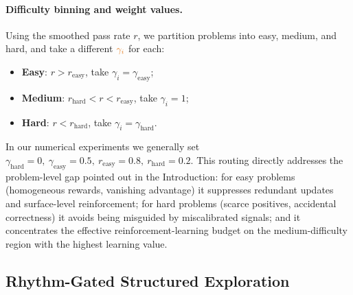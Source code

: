 \documentclass{article}
\begin{document}
\paragraph{Difficulty binning and weight values.}
Using the smoothed pass rate $r$, we partition problems into easy, medium, and hard, and take a different ${\color{cGamma}\gamma_i}$ for each:
\begin{itemize}
  \item \textbf{Easy}: $r > r_{\mathrm{easy}}$, take $\gamma_i = \gamma_{\mathrm{easy}}$;
  \item \textbf{Medium}: $r_{\mathrm{hard}} < r < r_{\mathrm{easy}}$, take $\gamma_i = 1$;
  \item \textbf{Hard}: $r < r_{\mathrm{hard}}$, take $\gamma_i = \gamma_{\mathrm{hard}}$.
\end{itemize}
In our numerical experiments we generally set $\gamma_{\mathrm{hard}}=0,\ \gamma_{\mathrm{easy}}=0.5,\ r_{\mathrm{easy}}=0.8,\ r_{\mathrm{hard}}=0.2$. This routing directly addresses the problem-level gap pointed out in the Introduction: for easy problems (homogeneous rewards, vanishing advantage) it suppresses redundant updates and surface-level reinforcement; for hard problems (scarce positives, accidental correctness) it avoids being misguided by miscalibrated signals; and it concentrates the effective reinforcement-learning budget on the medium-difficulty region with the highest learning value.

\subsection{Rhythm-Gated Structured Exploration}
\label{sec:rhythm}
\end{document}

